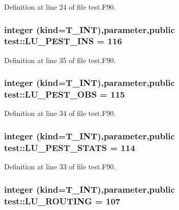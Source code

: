Definition at line 24 of file test.F90.

\hypertarget{namespacetest_a0796d8d42c3fd32614b1f4ac37aa21cf}{
\subsubsection[{LU\_\-PEST\_\-INS}]{\setlength{\rightskip}{0pt plus 5cm}integer (kind={\bf T\_\-INT}),parameter,public {\bf test::LU\_\-PEST\_\-INS} = 116}}
\label{namespacetest_a0796d8d42c3fd32614b1f4ac37aa21cf}


Definition at line 35 of file test.F90.

\hypertarget{namespacetest_a3b43ad5b8d9f36d9e1cfdf94bc02d83f}{
\subsubsection[{LU\_\-PEST\_\-OBS}]{\setlength{\rightskip}{0pt plus 5cm}integer (kind={\bf T\_\-INT}),parameter,public {\bf test::LU\_\-PEST\_\-OBS} = 115}}
\label{namespacetest_a3b43ad5b8d9f36d9e1cfdf94bc02d83f}


Definition at line 34 of file test.F90.

\hypertarget{namespacetest_a9a71f73b35c56ff97dfc0c438945e783}{
\subsubsection[{LU\_\-PEST\_\-STATS}]{\setlength{\rightskip}{0pt plus 5cm}integer (kind={\bf T\_\-INT}),parameter,public {\bf test::LU\_\-PEST\_\-STATS} = 114}}
\label{namespacetest_a9a71f73b35c56ff97dfc0c438945e783}


Definition at line 33 of file test.F90.

\hypertarget{namespacetest_a70f553900e15e79d97a1515e6550c1e7}{
\subsubsection[{LU\_\-ROUTING}]{\setlength{\rightskip}{0pt plus 5cm}integer (kind={\bf T\_\-INT}),parameter,public {\bf test::LU\_\-ROUTING} = 107}}
\label{namespacetest_a70f553900e15e79d97a1515e6550c1e7}


